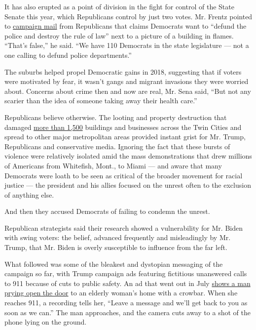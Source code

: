It has also erupted as a point of division in the fight for control of
the State Senate this year, which Republicans control by just two votes.
Mr. Frentz pointed to
\href{https://www.minnpost.com/greater-minnesota/2020/09/minnesota-republicans-are-deploying-their-own-law-and-order-strategy-in-legislative-races/}{campaign
mail} from Republicans that claims Democrats want to ``defund the police
and destroy the rule of law'' next to a picture of a building in flames.
``That's false,'' he said. ``We have 110 Democrats in the state
legislature --- not a one calling to defund police departments.''

The suburbs helped propel Democratic gains in 2018, suggesting that if
voters were motivated by fear, it wasn't gangs and migrant invasions
they were worried about. Concerns about crime then and now are real, Mr.
Sena said, ``But not any scarier than the idea of someone taking away
their health care.''

Republicans believe otherwise. The looting and property destruction that
damaged
\href{https://www.startribune.com/minneapolis-st-paul-buildings-are-damaged-looted-after-george-floyd-protests-riots/569930671/}{more
than 1,500} buildings and businesses across the Twin Cities and spread
to other major metropolitan areas provided instant grist for Mr. Trump,
Republicans and conservative media. Ignoring the fact that these bursts
of violence were relatively isolated amid the mass demonstrations that
drew millions of Americans from Whitefish, Mont., to Miami --- and aware
that many Democrats were loath to be seen as critical of the broader
movement for racial justice --- the president and his allies focused on
the unrest often to the exclusion of anything else.

And then they accused Democrats of failing to condemn the unrest.

Republican strategists said their research showed a vulnerability for
Mr. Biden with swing voters: the belief, advanced frequently and
misleadingly by Mr. Trump, that Mr. Biden is overly susceptible to
influence from the far left.

What followed was some of the bleakest and dystopian messaging of the
campaign so far, with Trump campaign ads featuring fictitious unanswered
calls to 911 because of cuts to public safety. An ad that went out in
July \href{https://www.youtube.com/watch?v=moZOrq0qL3Q}{shows a man
prying open the door} to an elderly woman's home with a crowbar. When
she reaches 911, a recording tells her, ``Leave a message and we'll get
back to you as soon as we can.'' The man approaches, and the camera cuts
away to a shot of the phone lying on the ground.

